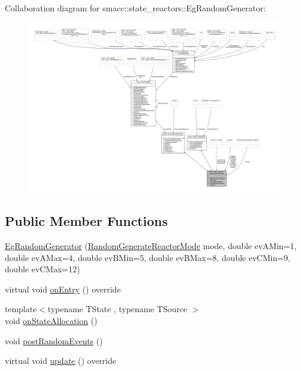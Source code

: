 Collaboration diagram for smacc\+:\+:state\+\_\+reactors\+:\+:Eg\+Random\+Generator\+:
\nopagebreak
\begin{figure}[H]
\begin{center}
\leavevmode
\includegraphics[width=350pt]{classsmacc_1_1state__reactors_1_1EgRandomGenerator__coll__graph}
\end{center}
\end{figure}
\subsection*{Public Member Functions}
\begin{DoxyCompactItemize}
\item 
\hyperlink{classsmacc_1_1state__reactors_1_1EgRandomGenerator_a091663782d496c7fd00e4d73ad38e011}{Eg\+Random\+Generator} (\hyperlink{namespacesmacc_1_1state__reactors_a038f8e362ad6d35494c940ee4c97a52e}{Random\+Generate\+Reactor\+Mode} mode, double ev\+A\+Min=1, double ev\+A\+Max=4, double ev\+B\+Min=5, double ev\+B\+Max=8, double ev\+C\+Min=9, double ev\+C\+Max=12)
\item 
virtual void \hyperlink{classsmacc_1_1state__reactors_1_1EgRandomGenerator_aec89532c1b53e42e5d9006eddfea10e6}{on\+Entry} () override
\item 
{\footnotesize template$<$typename T\+State , typename T\+Source $>$ }\\void \hyperlink{classsmacc_1_1state__reactors_1_1EgRandomGenerator_ad2e828248d15912cfe27953c8a0ddd51}{on\+State\+Allocation} ()
\item 
void \hyperlink{classsmacc_1_1state__reactors_1_1EgRandomGenerator_ab570c2d1a3e70adb8cfacfcd9000715e}{post\+Random\+Events} ()
\item 
virtual void \hyperlink{classsmacc_1_1state__reactors_1_1EgRandomGenerator_a0d442604ba19606ab12a384ee3998b49}{update} () override
\end{DoxyCompactItemize}
